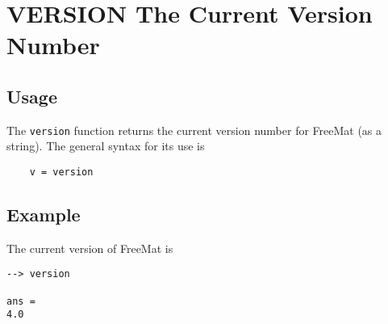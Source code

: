 \section{VERSION The Current Version Number}

\subsection{Usage}

The \verb|version| function returns the current version number for
FreeMat (as a string).  The general syntax for its use is
\begin{verbatim}
    v = version
\end{verbatim}
\subsection{Example}

The current version of FreeMat is
\begin{verbatim}
--> version

ans = 
4.0
\end{verbatim}
